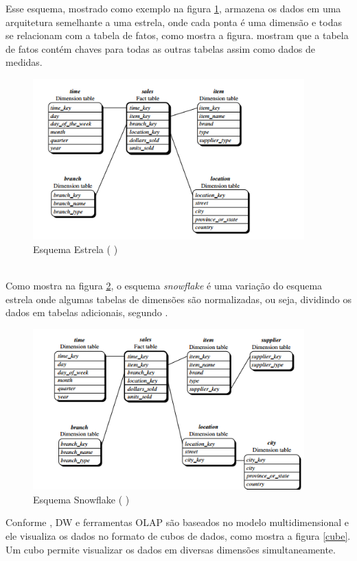 Esse esquema, mostrado como exemplo na figura \ref{star}, armazena os dados em uma arquitetura semelhante a uma estrela, onde cada ponta é uma dimensão e todas se relacionam com a tabela de fatos, como mostra a figura.  mostram que a tabela de fatos contém chaves para todas as outras tabelas assim como dados de medidas.
\begin{figure}[ht]
\centering
\includegraphics[height=6.2cm]{imagens/starscheme.png}
\caption{Esquema Estrela (\citeauthor{jmj} \citeyear{jmj})}
\label{star}
\end{figure}
\\
Como mostra na figura \ref{snowflake}, o esquema \textit{snowflake} é uma variação do esquema estrela onde algumas tabelas de dimensões são normalizadas, ou seja, dividindo os dados em tabelas adicionais, segundo .
\begin{figure}[ht]
\centering
\includegraphics[height=6.2cm]{imagens/snowflakescheme.png}
\caption{Esquema Snowflake (\citeauthor{jmj} \citeyear{jmj})}
\label{snowflake}
\end{figure}
Conforme , DW e ferramentas OLAP são baseados no modelo multidimensional e ele visualiza os dados no formato de cubos de dados, como mostra a figura \ref{cube}. Um cubo permite visualizar os dados em diversas dimensões simultaneamente.
